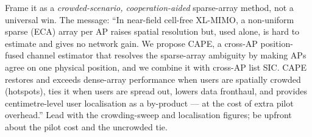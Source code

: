 \documentclass[11pt]{article}
\begin{document}
Frame it as a \emph{crowded-scenario, cooperation-aided} sparse-array method, not a universal
win. The message: ``In near-field cell-free XL-MIMO, a non-uniform sparse (ECA) array per AP
raises spatial resolution but, used alone, is hard to estimate and gives no network gain. We
propose CAPE, a cross-AP position-fused channel estimator that resolves the sparse-array
ambiguity by making APs agree on one physical position, and we combine it with cross-AP list SIC.
CAPE restores and exceeds dense-array performance when users are spatially crowded (hotspots),
ties it when users are spread out, lowers data fronthaul, and provides centimetre-level user
localisation as a by-product --- at the cost of extra pilot overhead.'' Lead with the
crowding-sweep and localisation figures; be upfront about the pilot cost and the uncrowded tie.
\end{document}
